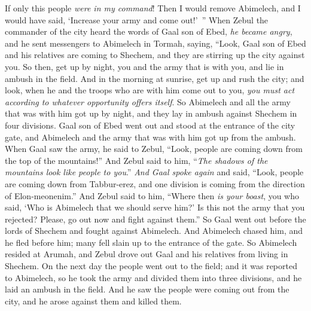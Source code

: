 \begin{biblechapter}
\verse If only this people \textit{were in my command}! Then I would remove Abimelech, and I would have said, ‘Increase your army and come out!’ ”
\verse When Zebul the commander of the city heard the words of Gaal son of Ebed, \textit{he became angry},
\verse and he sent messengers to Abimelech in Tormah, saying, “Look, Gaal son of Ebed and his relatives are coming to Shechem, and they are stirring up the city against you.
\verse So then, get up by night, you and the army that is with you, and lie in ambush in the field.
\verse And in the morning at sunrise, get up and rush the city; and look, when he and the troops who are with him come out to you, \textit{you must act according to whatever opportunity offers itself}.
\verse So Abimelech and all the army that was with him got up by night, and they lay in ambush against Shechem in four divisions.
\verse Gaal son of Ebed went out and stood at the entrance of the city gate, and Abimelech and the army that was with him got up from the ambush.
\verse When Gaal saw the army, he said to Zebul, “Look, people are coming down from the top of the mountains!” And Zebul said to him, “\textit{The shadows of the mountains look like people to you}.”
\verse \textit{And Gaal spoke again} and said, “Look, people are coming down from Tabbur-erez, and one division is coming from the direction of Elon-meonenim.”
\verse And Zebul said to him, “Where then \textit{is your boast}, you who said, ‘Who is Abimelech that we should serve him?’ Is this not the army that you rejected? Please, go out now and fight against them.”
\verse So Gaal went out before the lords of Shechem and fought against Abimelech.
\verse And Abimelech chased him, and he fled before him; many fell slain up to the entrance of the gate.
\verse So Abimelech resided at Arumah, and Zebul drove out Gaal and his relatives from living in Shechem.
\verse On the next day the people went out to the field; and it was reported to Abimelech,
\verse so he took the army and divided them into three divisions, and he laid an ambush in the field. And he saw the people were coming out from the city, and he arose against them and killed them.

\end{biblechapter}
